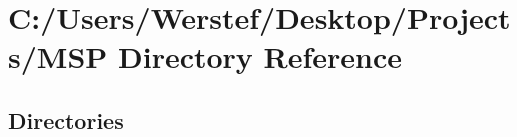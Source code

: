 \section{C\+:/\+Users/\+Werstef/\+Desktop/\+Projects/\+M\+SP Directory Reference}
\label{dir_a23b325c43a116a11190fca88351e3c9}
\subsection*{Directories}
\begin{DoxyCompactItemize}
\end{DoxyCompactItemize}
